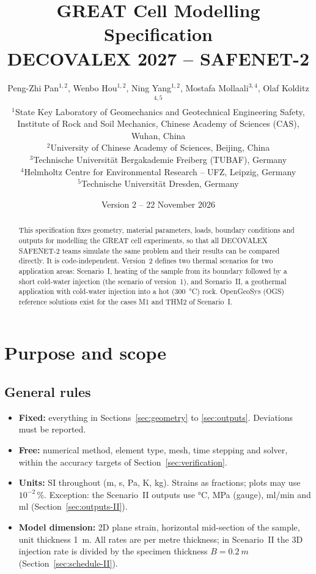 \documentclass[11pt,a4paper]{article}
\title{GREAT Cell Modelling Specification\\[0.5ex]
\large DECOVALEX 2027 -- SAFENET-2}
\author{Peng-Zhi Pan$^{1,2}$, Wenbo Hou$^{1,2}$, Ning Yang$^{1,2}$,
Mostafa Mollaali$^{3,4}$, Olaf Kolditz$^{4,5}$\\[2ex]
\small $^{1}$State Key Laboratory of Geomechanics and Geotechnical Engineering Safety,\\
\small Institute of Rock and Soil Mechanics, Chinese Academy of Sciences (CAS), Wuhan, China\\
\small $^{2}$University of Chinese Academy of Sciences, Beijing, China\\
\small $^{3}$Technische Universit\"at Bergakademie Freiberg (TUBAF), Germany\\
\small $^{4}$Helmholtz Centre for Environmental Research -- UFZ, Leipzig, Germany\\
\small $^{5}$Technische Universit\"at Dresden, Germany}
\date{Version 2 -- 22 November 2026}
\begin{document}
\maketitle

\begin{abstract}
This specification fixes geometry, material parameters, loads, boundary
conditions and outputs for modelling the GREAT cell experiments, so that all
DECOVALEX SAFENET-2 teams simulate the same problem and their results can be
compared directly. It is code-independent. Version~2 defines two thermal
scenarios for two application areas: Scenario~I, heating of the sample from
its boundary followed by a short cold-water injection (the scenario of
version~1), and Scenario~II, a geothermal application with cold-water
injection into a hot (\SI{300}{\celsius}) rock. OpenGeoSys (OGS) reference
solutions exist for the cases M1 and THM2 of Scenario~I.
\end{abstract}

\tableofcontents

\section{Purpose and scope}
\subsection{General rules}
\begin{itemize}
  \item \textbf{Fixed:} everything in Sections~\ref{sec:geometry} to
        \ref{sec:outputs}. Deviations must be reported.
  \item \textbf{Free:} numerical method, element type, mesh, time stepping and
        solver, within the accuracy targets of Section~\ref{sec:verification}.
  \item \textbf{Units:} SI throughout (m, s, Pa, K, kg). Strains as fractions;
        plots may use $10^{-2}$\,\%. Exception: the Scenario~II outputs use
        \si{\celsius}, MPa (gauge), ml/min and ml (Section~\ref{sec:outputs-II}).
  \item \textbf{Model dimension:} 2D plane strain, horizontal mid-section of
        the sample, unit thickness \SI{1}{m}. All rates are per metre thickness;
        in Scenario~II the 3D injection rate is divided by the specimen thickness
        $B=\SI{0.2}{m}$ (Section~\ref{sec:schedule-II}).
\end{itemize}
\end{document}
